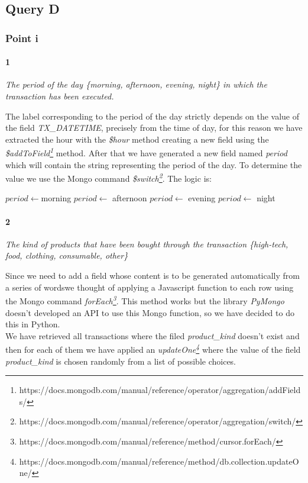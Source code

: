 \documentclass[runningheads]{llncs}
\begin{document}
\subsection{Query D}

\subsubsection{Point i}

\paragraph{1}

\emph{The period of the day \{morning, afternoon, evening, night\} in which the transaction has been executed.}

\hfill

The label corresponding to the period of the day strictly depends on the value of the field \emph{TX\_DATETIME}, precisely from the time of day, for this reason we have extracted the hour with the \emph{\$hour} method creating a new field using the \emph{\$addToField\footnote{https://docs.mongodb.com/manual/reference/operator/aggregation/addFields/}} method. After that we have generated a new field named \emph{period} which will contain the string representing the period of the day. To determine the value we use the Mongo command \emph{\$switch\footnote{https://docs.mongodb.com/manual/reference/operator/aggregation/switch/}}. The logic is:\\

\begin{algorithmic}
    \State $period \gets $morning
\Else
        \State $period \gets $ afternoon
\Else
        \State $period \gets $ evening
\Else
    \State $period \gets $ night
\EndIf
\EndIf
\EndIf
\end{algorithmic}

\paragraph{2}

\emph{The kind of products that have been bought through the transaction \{high-tech, food, clothing, consumable, other\}}

\hfill

Since we need to add a field whose content is to be generated automatically from a series of wordswe thought of applying a Javascript function to each row using the Mongo command \emph{forEach\footnote{https://docs.mongodb.com/manual/reference/method/cursor.forEach/}}. This method works but the library \emph{PyMongo} doesn't developed an API to use this Mongo function, so we have decided to do this in Python.\\
We have retrieved all transactions where the filed \emph{product\_kind} doesn't exist and then for each of them we have applied an \emph{updateOne\footnote{https://docs.mongodb.com/manual/reference/method/db.collection.updateOne/}} where the value of the field \emph{product\_kind} is chosen randomly from a list of possible choices.
\end{document}
